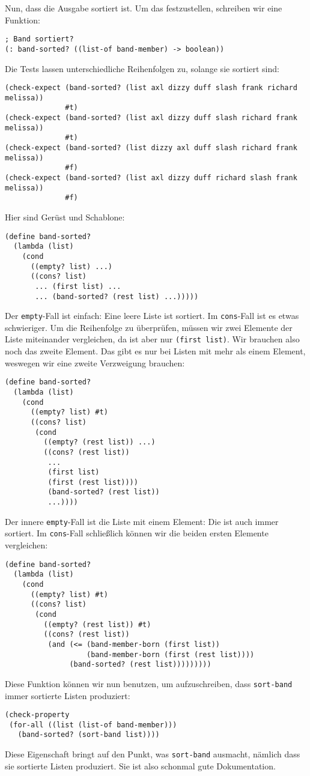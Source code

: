 Nun, dass die Ausgabe sortiert ist.  Um das festzustellen, schreiben
wir eine Funktion:
%
\begin{lstlisting}
; Band sortiert?
(: band-sorted? ((list-of band-member) -> boolean))
\end{lstlisting}
%
Die Tests lassen unterschiedliche Reihenfolgen zu, solange sie
sortiert sind:
%
\begin{lstlisting}
(check-expect (band-sorted? (list axl dizzy duff slash frank richard melissa))
              #t)
(check-expect (band-sorted? (list axl dizzy duff slash richard frank melissa))
              #t)
(check-expect (band-sorted? (list dizzy axl duff slash richard frank melissa))
              #f)
(check-expect (band-sorted? (list axl dizzy duff richard slash frank melissa))
              #f)
\end{lstlisting}
%
Hier sind Gerüst und Schablone:
%
\begin{lstlisting}
(define band-sorted?
  (lambda (list)
    (cond
      ((empty? list) ...)
      ((cons? list)
       ... (first list) ...
       ... (band-sorted? (rest list) ...)))))
\end{lstlisting}
%
Der \lstinline{empty}-Fall ist einfach: Eine leere Liste ist sortiert.
Im \lstinline{cons}-Fall ist es etwas schwieriger.  Um die Reihenfolge
zu überprüfen, müssen wir zwei Elemente der Liste miteinander
vergleichen, da ist aber nur \lstinline{(first list)}.  Wir brauchen
also noch das zweite Element.  Das gibt es nur bei Listen mit mehr als
einem Element, weswegen wir eine zweite Verzweigung brauchen:
%
\begin{lstlisting}
(define band-sorted?
  (lambda (list)
    (cond
      ((empty? list) #t)
      ((cons? list)
       (cond
         ((empty? (rest list)) ...)
         ((cons? (rest list))
          ...
          (first list)
          (first (rest list))))
          (band-sorted? (rest list))
          ...))))
\end{lstlisting}
%
Der innere \lstinline{empty}-Fall ist die Liste mit einem Element: Die
ist auch immer sortiert.  Im \lstinline{cons}-Fall schließlich können
wir die beiden ersten Elemente vergleichen:
%
\begin{lstlisting}
(define band-sorted?
  (lambda (list)
    (cond
      ((empty? list) #t)
      ((cons? list)
       (cond
         ((empty? (rest list)) #t)
         ((cons? (rest list))
          (and (<= (band-member-born (first list))
                   (band-member-born (first (rest list))))
               (band-sorted? (rest list)))))))))
\end{lstlisting}
%
Diese Funktion können wir nun benutzen, um aufzuschreiben, dass
\lstinline{sort-band} immer sortierte Listen produziert:
%
\begin{lstlisting}
(check-property
 (for-all ((list (list-of band-member)))
   (band-sorted? (sort-band list))))
\end{lstlisting}
%
Diese Eigenschaft bringt auf den Punkt, was \lstinline{sort-band}
ausmacht, nämlich dass sie sortierte Listen produziert.  Sie ist also
schonmal gute Dokumentation.

